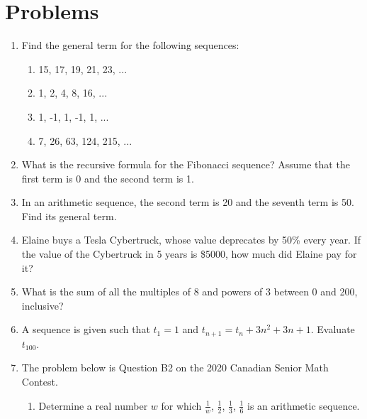 \documentclass[12pt]{extarticle}
\begin{document}
\section{Problems}
\begin{enumerate}
    \itemsep 2.0em
    \item {Find the general term for the following sequences:
        \begin{enumerate}
            \item {15, 17, 19, 21, 23, ...} %
            \item {1, 2, 4, 8, 16, ...} %
            \item {1, -1, 1, -1, 1, ...} %
            \item {7, 26, 63, 124, 215, ...} %
        \end{enumerate}
    }
    \item {What is the recursive formula for the Fibonacci sequence? Assume that the first term is 0 and the second term is 1.} %
    \item {In an arithmetic sequence, the second term is 20 and the seventh term is 50. Find its general term.} %
    \item {Elaine buys a Tesla Cybertruck, whose value deprecates by 50\% every year. If the value of the Cybertruck in 5 years is \$5000, how much did Elaine pay for it?} %
    \item {What is the sum of all the multiples of 8 and powers of 3 between 0 and 200, inclusive?} %
    \item {A sequence is given such that $t_1 = 1$ and $t_{n+1} = t_n + 3n^2 + 3n + 1$. Evaluate $t_{100}$.} %
    \item {The problem below is Question B2 on the 2020 Canadian Senior Math Contest.
        \begin{enumerate}
            \itemsep 2.0em
            \item {Determine a real number $w$ for which $\frac{1}{w}$, $\frac{1}{2}$, $\frac{1}{3}$, $\frac{1}{6}$ is an arithmetic sequence.} %

\end{enumerate}}
\end{enumerate}
\end{document}
